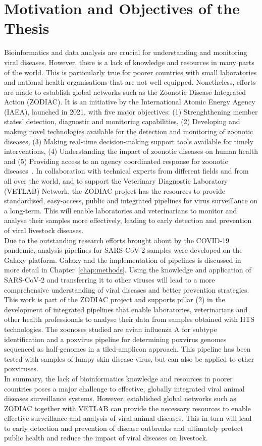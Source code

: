 \section{Motivation and Objectives of the Thesis}
Bioinformatics and data analysis are crucial for understanding and monitoring viral diseases. However, there is a lack of knowledge and resources in many parts of the world. This is particularly true for poorer countries with small laboratories and national health organisations that are not well equipped. Nonetheless, efforts are made to establish global networks such as the Zoonotic Disease Integrated Action (ZODIAC). It is an initiative by the International Atomic Energy Agency (IAEA), launched in 2021, with five major objectives: (1) Strenghthening member states' detection, diagnostic and monitoring capabilities, (2) Developing and making novel technologies available for the detection and monitoring of zoonotic diseases, (3) Making real-time decision-making support tools available for timely interventions, (4) Understanding the impact of zoonotic diseases on human health and (5) Providing access to an agency coordinated response for zoonotic diseases~\cite{zodiac2021}. In collaboration with technical experts from different fields and from all over the world, and to support the Veterinary Diagnostic Laboratory (VETLAB) Network, the ZODIAC project has the resources to provide standardised, easy-access, public and integrated pipelines for virus surveillance on a long-term. This will enable laboratories and veterinarians to monitor and analyse their samples more effectively, leading to early detection and prevention of viral livestock diseases.\\
Due to the outstanding research efforts brought about by the COVID-19 pandemic, analysis pipelines for SARS-CoV-2 samples were developed on the Galaxy platform. Galaxy and the implementation of pipelines is discussed in more detail in Chapter~\ref{chap:methods}. Using the knowledge and application of SARS-CoV-2 and transferring it to other viruses will lead to a more comprehensive understanding of viral diseases and better prevention strategies.\\
This work is part of the ZODIAC project and supports pillar (2) in the development of integrated pipelines that enable laboratories, veterinarians and other health professionals to analyse their data from samples obtained with HTS technologies. The zoonoses studied are avian influenza A for subtype identification and a poxvirus pipeline for determining poxvirus genomes sequenced as half-genomes in a tiled-amplicon approach. This pipeline has been tested with samples of lumpy skin disease virus, but can also be applied to other poxviruses.\\
In summary, the lack of bioinformatics knowledge and resources in poorer countries poses a major challenge to effective, globally integrated viral animal diseases surveillance systems. However, established global networks such as ZODIAC together with VETLAB can provide the necessary resources to enable effective surveillance and analysis of viral animal diseases. This in turn will lead to early detection and prevention of disease outbreaks and ultimately protect public health and reduce the impact of viral diseases on livestock.
